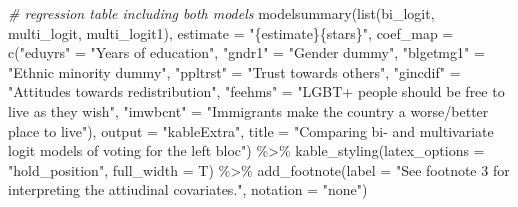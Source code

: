 \documentclass[
]{article}
\newenvironment{Shaded}{\begin{snugshade}}{\end{snugshade}}
\newcommand{\AttributeTok}[1]{\textcolor[rgb]{0.77,0.63,0.00}{#1}}
\newcommand{\CommentTok}[1]{\textcolor[rgb]{0.56,0.35,0.01}{\textit{#1}}}
\newcommand{\FunctionTok}[1]{\textcolor[rgb]{0.00,0.00,0.00}{#1}}
\newcommand{\NormalTok}[1]{#1}
\newcommand{\OtherTok}[1]{\textcolor[rgb]{0.56,0.35,0.01}{#1}}
\newcommand{\SpecialCharTok}[1]{\textcolor[rgb]{0.00,0.00,0.00}{#1}}
\newcommand{\StringTok}[1]{\textcolor[rgb]{0.31,0.60,0.02}{#1}}
\begin{document}
\begin{Shaded}
\begin{Highlighting}[]
\CommentTok{\# regression table including both models}
\FunctionTok{modelsummary}\NormalTok{(}\FunctionTok{list}\NormalTok{(bi\_logit, multi\_logit, multi\_logit1),}
             \AttributeTok{estimate =} \StringTok{"\{estimate\}\{stars\}"}\NormalTok{, }
             \AttributeTok{coef\_map =} \FunctionTok{c}\NormalTok{(}\StringTok{"eduyrs"} \OtherTok{=} \StringTok{"Years of education"}\NormalTok{,}
                         \StringTok{"gndr1"} \OtherTok{=} \StringTok{"Gender dummy"}\NormalTok{,}
                         \StringTok{"blgetmg1"} \OtherTok{=} \StringTok{"Ethnic minority dummy"}\NormalTok{,}
                         \StringTok{"ppltrst"} \OtherTok{=} \StringTok{"Trust towards others"}\NormalTok{,}
                         \StringTok{"gincdif"} \OtherTok{=} \StringTok{"Attitudes towards redistribution"}\NormalTok{,}
                         \StringTok{"feehms"} \OtherTok{=} \StringTok{"LGBT+ people should be free to live as they wish"}\NormalTok{,}
                         \StringTok{"imwbcnt"} \OtherTok{=} \StringTok{"Immigrants make the country a worse/better place to live"}\NormalTok{),}
             \AttributeTok{output =} \StringTok{"kableExtra"}\NormalTok{, }
             \AttributeTok{title =} \StringTok{"Comparing bi{-} and multivariate logit models of voting for the left bloc"}\NormalTok{) }\SpecialCharTok{\%\textgreater{}\%}
  \FunctionTok{kable\_styling}\NormalTok{(}\AttributeTok{latex\_options =} \StringTok{"hold\_position"}\NormalTok{, }\AttributeTok{full\_width =}\NormalTok{ T) }\SpecialCharTok{\%\textgreater{}\%}
  \FunctionTok{add\_footnote}\NormalTok{(}\AttributeTok{label =} \StringTok{"See footnote 3 for interpreting the attiudinal covariates."}\NormalTok{, }\AttributeTok{notation =} \StringTok{"none"}\NormalTok{)}
\end{Highlighting}
\end{Shaded}
\end{document}
